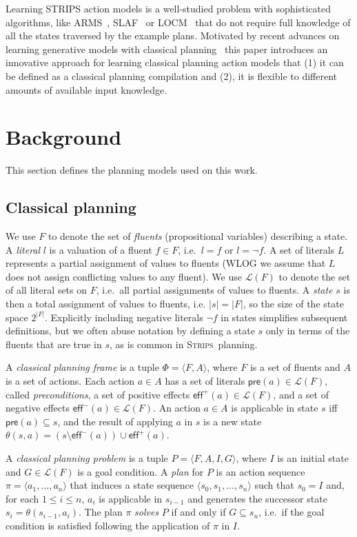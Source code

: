 \documentclass[letterpaper]{article} %
\newcommand{\tup}[1]{{\langle #1 \rangle}}
\newcommand{\pre}{\mathsf{pre}}     %
\newcommand{\eff}{\mathsf{eff}}     %
\newcommand{\strips}{\textsc{Strips}}     %
\begin{document}
Learning STRIPS action models is a well-studied problem with sophisticated algorithms, like {\sc ARMS}~\cite{yang2007learning}, {\sc SLAF}~\cite{amir:alearning:JAIR08} or {\sc LOCM}~\cite{cresswell2013acquiring} that do not require full knowledge of all the states traversed by the example plans. Motivated by recent advances on learning generative models with classical planning~\cite{bonet2009automatic,segovia2016hierarchical,segovia2017generating} this paper introduces an innovative approach for learning classical planning action models that (1) it can be defined as a classical planning compilation and (2), it is flexible to different amounts of available input knowledge.


\section{Background}
This section defines the planning models used on this work.

\subsection{Classical planning}
We use $F$ to denote the set of {\em fluents} (propositional variables) describing a state. A {\em literal} $l$ is a valuation of a fluent $f\in F$, i.e.~$l=f$ or $l=\neg f$. A set of literals $L$ represents a partial assignment of values to fluents (WLOG we assume that $L$ does not assign conflicting values to any fluent). We use $\mathcal{L}(F)$ to denote the set of all literal sets on $F$, i.e.~all partial assignments of values to fluents. A {\em state} $s$ is then a total assignment of values to fluents, i.e. $|s|=|F|$, so the size of the state space $2^{|F|}$. Explicitly including negative literals $\neg f$ in states simplifies subsequent definitions, but we often abuse notation by defining a state $s$ only in terms of the fluents that are true in $s$, as is common in \strips\ planning.

A {\em classical planning frame} is a tuple $\Phi=\tup{F,A}$, where $F$ is a set of fluents and $A$ is a set of actions. Each action $a\in A$ has a set of literals $\pre(a)\in\mathcal{L}(F)$, called {\em preconditions}, a set of positive effects $\eff^+(a)\in\mathcal{L}(F)$, and a set of negative effects $\eff^-(a)\in\mathcal{L}(F)$. An action $a\in A$ is applicable in state $s$ iff $\pre(a)\subseteq s$, and the result of applying $a$ in $s$ is a new state $\theta(s,a)=(s\setminus \eff^-(a))\cup\eff^+(a)$.

A {\em classical planning problem} is a tuple $P=\tup{F,A,I,G}$, where $I$ is an initial state and $G\in\mathcal{L}(F)$ is a goal condition. A {\em plan} for $P$ is an action sequence $\pi=\tup{a_1, \ldots, a_n}$ that induces a state sequence $\tup{s_0, s_1, \ldots, s_n}$ such that $s_0=I$ and, for each {\small $1\leq i\leq n$}, $a_i$ is applicable in $s_{i-1}$ and generates the successor state $s_i=\theta(s_{i-1},a_i)$. The plan $\pi$ {\em solves} $P$ if and only if $G\subseteq s_n$, i.e.~if the goal condition is satisfied following the application of $\pi$ in $I$.
\end{document}
